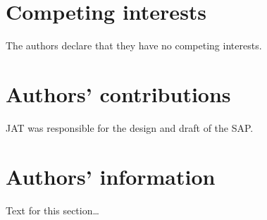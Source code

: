 \documentclass{bmcart}
\begin{document}
\begin{backmatter}
\section*{Competing interests}
The authors declare that they have no competing interests.

\section*{Authors' contributions}
JAT was responsible for the design and draft of the SAP.

\section*{Authors' information}%
Text for this section\ldots






\end{backmatter}
\end{document}

